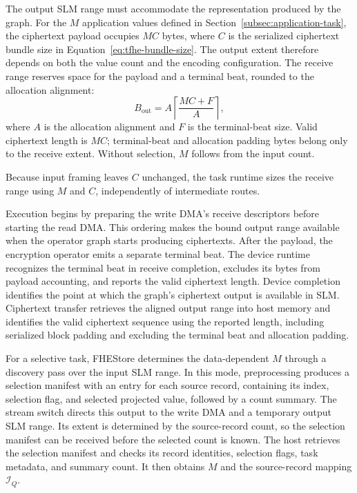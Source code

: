 \documentclass[sigconf,anonymous,balance=false]{acmart}
\newcommand{\bodypar}{\par\vskip 0pt plus 6pt\relax}
\begin{document}
The output SLM range must accommodate the representation produced by the graph. For the $M$ application values defined in Section~\ref{subsec:application-task}, the ciphertext payload occupies $MC$ bytes, where $C$ is the serialized ciphertext bundle size in Equation~\eqref{eq:tfhe-bundle-size}. The output extent therefore depends on both the value count and the encoding configuration. The receive range reserves space for the payload and a terminal beat, rounded to the allocation alignment:
\begin{equation}
  B_{\mathrm{out}}=A\left\lceil\frac{MC+F}{A}\right\rceil,
  \label{eq:production-output-range}
\end{equation}
where $A$ is the allocation alignment and $F$ is the terminal-beat size. Valid ciphertext length is $MC$; terminal-beat and allocation padding bytes belong only to the receive extent. Without selection, $M$ follows from the input count.
\bodypar

Because input framing leaves $C$ unchanged, the task runtime sizes the receive range using $M$ and $C$, independently of intermediate routes.
\bodypar

Execution begins by preparing the write DMA's receive descriptors before starting the read DMA. This ordering makes the bound output range available when the operator graph starts producing ciphertexts. After the payload, the encryption operator emits a separate terminal beat. The device runtime recognizes the terminal beat in receive completion, excludes its bytes from payload accounting, and reports the valid ciphertext length. Device completion identifies the point at which the graph's ciphertext output is available in SLM. Ciphertext transfer retrieves the aligned output range into host memory and identifies the valid ciphertext sequence using the reported length, including serialized block padding and excluding the terminal beat and allocation padding.
\bodypar

For a selective task, FHEStore determines the data-dependent $M$ through a discovery pass over the input SLM range. In this mode, preprocessing produces a selection manifest with an entry for each source record, containing its index, selection flag, and selected projected value, followed by a count summary. The stream switch directs this output to the write DMA and a temporary output SLM range. Its extent is determined by the source-record count, so the selection manifest can be received before the selected count is known. The host retrieves the selection manifest and checks its record identities, selection flags, task metadata, and summary count. It then obtains $M$ and the source-record mapping $\mathcal{I}_Q$.
\bodypar
\end{document}
